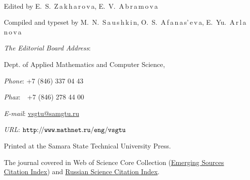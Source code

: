 \clearpage
\thispagestyle{empty}

$\;$
\vfill

\begin{minipage}{12cm}
\footnotesize
{\centering \par
Edited by E.~S.~Z\,a\,k\,h\,a\,r\,o\,v\,a, E.~V.~A\,b\,r\,a\,m\,o\,v\,a \par \smallskip
Compiled and typeset by M.~N.~S\,a\,u\,s\,h\,k\,i\,n, O.~S.~A\,f\,a\,n\,a\,s'\,e\,v\,a, E.~Yu.~A\,r\,l\,a\,n\,o\,v\,a \par \bigskip}



 

{\small \textit{The Editorial Board Address}\/:}\par \smallskip
Dept. of Applied Mathematics and Computer Science, \par 
\ensamgtu \par\medskip
\textit{Phone}\/: +7 (846) 337 04 43 \par 
\textit{Phax}\/:~\,\,\,+7 (846) 278 44 00 \par 
\textit{E-mail}\/: \href{mailto:vsgtu@samgtu.ru}{vsgtu@samgtu.ru}\par 
\textit{URL}\/: \mbox{\href{http://www.mathnet.ru/eng/vsgtu}{$\tt http{:}{/\!/}www.mathnet.ru{/}eng{/}vsgtu$}}
\par\medskip
Printed at the Samara State Technical University Press.
\par \bigskip
\fontsize{9pt}{8pt}\selectfont
The journal covered in Web of Science Core Collection (\href{http://mjl.clarivate.com/cgi-bin/jrnlst/jlresults.cgi?PC=MASTER\&ISSN=1991-8615}{Emerging Sources Citation Index}) and  \href{http://wokinfo.com/products_tools/multidisciplinary/rsci/}{Russian Science Citation Index}.

\end{minipage}
